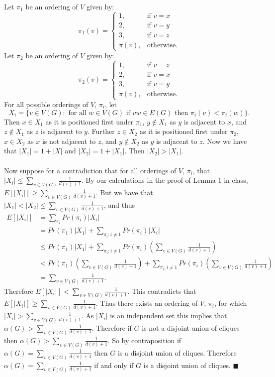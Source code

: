 \documentclass[letterpaper,12pt,oneside,onecolumn]{article}
\begin{document}
\paragraph{}
Let $\pi_1$ be an ordering of $V$ given by:
$$
\pi_1(v) = \begin{cases}
1, &\text{if $v=x$}\\
2, &\text{if $v=y$}\\
3, &\text{if $v=z$}\\
\pi(v), &\text{otherwise}.
\end{cases}
$$
Let $\pi_2$ be an ordering of $V$ given by:
$$
\pi_2(v) = \begin{cases}
1, &\text{if $v=z$}\\
2, &\text{if $v=x$}\\
3, &\text{if $v=y$}\\
\pi(v), &\text{otherwise}.
\end{cases}
$$
For all possible orderings of $V$, $\pi_i$, let $$X_i = \{v \in V(G):\text{ for all }w\in V(G)\text{ if }vw \in E(G)\text{ then }\pi_i(v) < \pi_i(w)\}.$$ Then $x \in X_1$ as it is positioned first under $\pi_1$, $y \not\in X_1$ as $y$ is adjacent to $x$, and $z \not\in X_1$ as $z$ is adjacent to $y$.  Further $z \in X_2$ as it is positioned first under $\pi_2$, $x \in X_2$ as $x$ is not adjacent to $z$, and $y \not\in X_2$ as $y$ is adjacent to $z$. Now we have that $|X_1| = 1 + |X|$ and $|X_2| = 1 + |X_1|$. Then $|X_2| > |X_1|$.
\paragraph{}
Now suppose for a contradiction that for all orderings of $V$, $\pi_i$, that $|X_i| \leq \sum_{v \in V(G)} \frac{1}{d(v)+1}$. By our calculations in the proof of Lemma $1$ in class,  $E[|X_i|] \geq \sum_{v \in V(G)} \frac{1}{d(v)+1}$. But we have that $|X_1| < |X_2| \leq \sum_{v \in V(G)} \frac{1}{d(v)+1}$, and thus
\begin{align*}
E[|X_i|] &= \sum_{\pi_i} Pr(\pi_i) |X_i| \\
&= Pr(\pi_1)|X_1| +  \sum_{\pi_i: i\neq 1} Pr(\pi_i)|X_i| \\
&\leq Pr(\pi_1)|X_1| + \sum_{\pi_i:i\neq 1} Pr(\pi_i)(\sum_{v \in V(G)} \frac{1}{d(v)+1}) \\
&< Pr(\pi_1)(\sum_{v \in V(G)} \frac{1}{d(v)+1}) + \sum_{\pi_i:i\neq 1} Pr(\pi_i)(\sum_{v \in V(G)} \frac{1}{d(v)+1})  \\
&= \sum_{v \in V(G)} \frac{1}{d(v)+1}.
\end{align*}
Therefore $E[|X_i|] <  \sum_{v \in V(G)} \frac{1}{d(v)+1}$. This contradicts that $E[|X_i|] \geq \sum_{v \in V(G)} \frac{1}{d(v)+1}$. Thus there exists an ordering of $V$, $\pi_i$, for which $|X_i| > \sum_{v \in V(G)} \frac{1}{d(v)+1}$. As $|X_i|$ is an independent set this implies that $\alpha(G) > \sum_{v \in V(G)} \frac{1}{d(v)+1}$. Therefore if $G$ is not a disjoint union of cliques then $\alpha(G) > \sum_{v \in V(G)} \frac{1}{d(v)+1}$. So by contraposition if $\alpha(G) = \sum_{v\in V(G)} \frac{1}{d(v) + 1}$ then $G$ is a disjoint union of cliques. Therefore $\alpha(G) = \sum_{v\in V(G)} \frac{1}{d(v) + 1}$ if and only if $G$ is a disjoint union of cliques. $\blacksquare$
\end{document}
